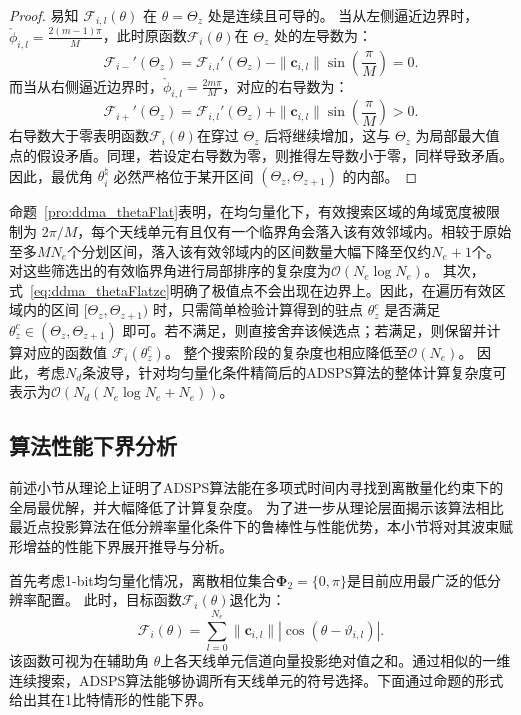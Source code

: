 \begin{proof}
	易知 $\mathcal{F}_{i,l}(\theta)$ 在 $\theta = \Theta_z$ 处是连续且可导的。
	当从左侧逼近边界时，$\check{\phi}_{i,l} = \frac{2(m-1)\pi}{M}$，此时原函数$\mathcal{F}_i(\theta)$在 $\Theta_z$ 处的左导数为：
	\begin{equation}
		\mathcal{F}_{i-}'(\Theta_z) = \mathcal{F}_{i,l}'(\Theta_z) - \|\bm{c}_{i,l}\| \sin\left(\frac{\pi}{M}\right) = 0.
	\end{equation}
	而当从右侧逼近边界时，$\check{\phi}_{i,l} = \frac{2m\pi}{M}$，对应的右导数为：
	\begin{equation}
		\mathcal{F}_{i+}'(\Theta_z) = \mathcal{F}_{i,l}'(\Theta_z) + \|\bm{c}_{i,l}\| \sin\left(\frac{\pi}{M}\right) > 0.
	\end{equation}
	右导数大于零表明函数$\mathcal{F}_i(\theta)$在穿过 $\Theta_z$ 后将继续增加，这与 $\Theta_z$ 为局部最大值点的假设矛盾。同理，若设定右导数为零，则推得左导数小于零，同样导致矛盾。因此，最优角 $\theta_i^{\natural}$ 必然严格位于某开区间 $(\Theta_z, \Theta_{z+1})$ 的内部。
\end{proof}

命题~\ref{pro:ddma_thetaFlat}表明，在均匀量化下，有效搜索区域的角域宽度被限制为 $2\pi/M$，每个天线单元有且仅有一个临界角会落入该有效邻域内。相较于原始至多$MN_e$个分划区间，落入该有效邻域内的区间数量大幅下降至仅约$N_e+1$个。对这些筛选出的有效临界角进行局部排序的复杂度为$\mathcal{O}(N_e \log N_e)$。
其次，式~\eqref{eq:ddma_thetaFlatzc}明确了极值点不会出现在边界上。因此，在遍历有效区域内的区间 $[\Theta_z, \Theta_{z+1})$ 时，只需简单检验计算得到的驻点 $\theta_z^c$ 是否满足 $\theta_z^c \in (\Theta_z, \Theta_{z+1})$ 即可。若不满足，则直接舍弃该候选点；若满足，则保留并计算对应的函数值 $\mathcal{F}_i(\theta_z^c)$。
整个搜索阶段的复杂度也相应降低至$\mathcal{O}(N_e)$。
因此，考虑$N_d$条波导，针对均匀量化条件精简后的ADSPS算法的整体计算复杂度可表示为$\mathcal{O}\left( N_d (N_e \log N_e + N_e) \right)$。

\subsection{算法性能下界分析}

前述小节从理论上证明了ADSPS算法能在多项式时间内寻找到离散量化约束下的全局最优解，并大幅降低了计算复杂度。
为了进一步从理论层面揭示该算法相比最近点投影算法在低分辨率量化条件下的鲁棒性与性能优势，本小节将对其波束赋形增益的性能下界展开推导与分析。

首先考虑1-bit均匀量化情况，离散相位集合$\bm \Phi_2 = \{0, \pi\}$是目前应用最广泛的低分辨率配置。
此时，目标函数$\mathcal F_{i}(\theta)$退化为：
\begin{equation}\label{eq:ddma_Fi_theta_1bit}
	\mathcal F_{i}(\theta) = \sum_{l=0}^{N_e} \|\bm{c}_{i,l}\| |\cos(\theta - \vartheta_{i,l})|.
\end{equation}
该函数可视为在辅助角 $\theta$上各天线单元信道向量投影绝对值之和。通过相似的一维连续搜索，ADSPS算法能够协调所有天线单元的符号选择。下面通过命题的形式给出其在1比特情形的性能下界。

